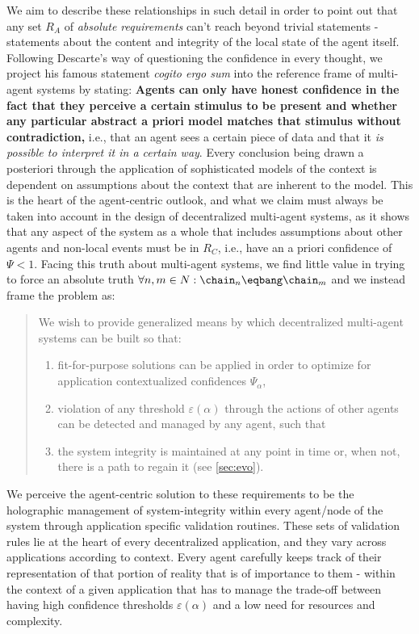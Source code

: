 \documentclass[twocolumn,showpacs,%
  nofootinbib,aps,superscriptaddress,%
  eqsecnum,prd,notitlepage,showkeys,10pt]{revtex4-1}
\begin{document}
We aim to describe these relationships in such detail in order to point out that any set $R_A$ of \textit{absolute requirements} can't reach beyond trivial statements - statements about the content and integrity of the local state of the agent itself. Following Descarte's way of questioning the confidence in every thought, we project his famous statement \textit{cogito ergo sum} into the reference frame of multi-agent systems by stating: \textbf{Agents can only have honest confidence in the fact that they perceive a certain stimulus to be present and whether any particular abstract a priori model matches that stimulus without contradiction,} i.e., that an agent sees a certain piece of data and that it \textit{is possible to interpret it in a certain way}. Every conclusion being drawn a posteriori through the application of sophisticated models of the context is dependent on assumptions about the context that are inherent to the model. This is the heart of the agent-centric outlook, and what we claim must always be taken into account in the design of decentralized multi-agent systems, as it shows that any aspect of the system as a whole that includes assumptions about other agents and non-local events must be in $R_C$, i.e., have an a priori confidence of $\Psi<1$. Facing this truth about multi-agent systems, we find little value in trying to force an absolute truth $\forall n,m \in N: \chain_n\eqbang\chain_m$ and we instead frame the problem as:
\\
\begin{quote}
We wish to provide generalized means by which decentralized multi-agent systems can be built so that:
\begin{enumerate}
\item fit-for-purpose solutions can be applied in order to optimize for application contextualized confidences $\Psi_\alpha$,
\item violation of any threshold $\varepsilon(\alpha)$ through the actions of other agents can be detected and managed by any agent, such that
\item the system integrity is maintained at any point in time or, when not, there is a path to regain it (see \ref{sec:evo}).
\end{enumerate}
\end{quote}

We perceive the agent-centric solution to these requirements to be the holographic management of system-integrity within every agent/node of the system through application specific validation routines. These sets of validation rules lie at the heart of every decentralized application, and they vary across applications according to context. Every agent carefully keeps track of their representation of that portion of reality that is of importance to them - within the context of a given application that has to manage the trade-off between having high confidence thresholds $\varepsilon(\alpha)$ and a low need for resources and complexity.
\end{document}

